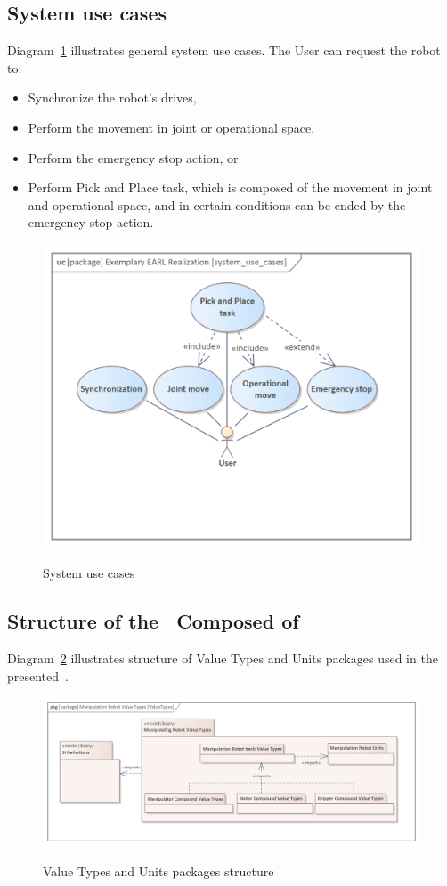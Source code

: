 \documentclass[11pt,oneside,a4paper]{article}
\begin{document}
	\subsection{System use cases}
	Diagram~\ref{fig:system_use_cases} illustrates general system use cases. The User can request the robot to:
	\begin{itemize}
		\item Synchronize the robot's drives,
		\item Perform the movement in joint or operational space,
		\item Perform the emergency stop action, or
		\item Perform Pick and Place task, which is composed of the movement in joint and operational space, and in certain conditions can be ended by the emergency stop action.
	\end{itemize}
	\begin{figure}[H]
		\centering
		\begin{center}
			{\includegraphics[width=0.6\columnwidth]{img/basic_earl_instance/system_use_cases.png}}
		\end{center}
		\caption{System use cases}
		\label{fig:system_use_cases}
	\end{figure}
	
	\subsection{Structure of the~\System{} Composed of \Agents{}}
	Diagram~\ref{fig:value_types_pkgs} illustrates structure of Value Types and Units packages used in the presented~\System{}.
	\begin{figure}[H]
		\centering
		\begin{center}
			{\includegraphics[width=\columnwidth]{img/value_types/value_types_pkgs.png}}
		\end{center}
		\caption{Value Types and Units packages structure}
		\label{fig:value_types_pkgs}
	\end{figure}
\end{document}
